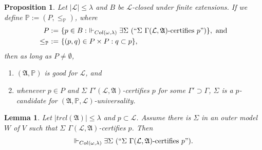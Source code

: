 \documentclass[12pt, twoside]{memoir}
\numberwithin{equation}{section}
\newtheorem{lem}[thm]{Lemma}
\newtheorem{prop}[thm]{Proposition}
\theoremstyle{definition}
\theoremstyle{remark}
\theoremstyle{definition}
\theoremstyle{definition}
\theoremstyle{definition}
\theoremstyle{remark}
\begin{document}
\begin{prop}\label{certgood}
Let $|\mathcal{L}| \leq \lambda$ and $B$ be $\mathcal{L}$-closed under finite extensions. If we define $\mathbb{P} := (P, \leq_{\mathbb{P}})$, where
\begin{align*}
    P := \ & \{p \in B : \ \Vdash_{Col(\omega, \lambda)} \exists \Sigma \ (``\Sigma \ \Gamma(\mathcal{L}, \mathfrak{A}) \text{-certifies } p")\}, \text{ and} \\
    \leq_{\mathbb{P}} \ := \ & \{(p, q) \in P \times P : q \subset p\},
\end{align*}
then as long as $P \neq \emptyset$, 
\begin{enumerate}[label=(\alph*)]
    \item $(\mathfrak{A}, \mathbb{P})$ is good for $\mathcal{L}$, and
    \item whenever $p \in P$ and $\Sigma$ $\Gamma'(\mathcal{L}, \mathfrak{A})$-certifies $p$ for some $\Gamma' \supset \Gamma$, $\Sigma$ is a $p$-candidate for $(\mathfrak{A}, \mathbb{P}, \mathcal{L})$-universality.
\end{enumerate}
\end{prop}

\begin{lem}\label{inout}
Let $|trcl(\mathfrak{A})| \leq \lambda$ and $p \subset \mathcal{L}$. Assume there is $\Sigma$ in an outer model $W$ of $V$ such that $\Sigma$ $\Gamma(\mathcal{L}, \mathfrak{A})$-certifies $p$. Then $$\Vdash_{Col(\omega, \lambda)} \exists \Sigma \ (``\Sigma \ \Gamma(\mathcal{L}, \mathfrak{A}) \text{-certifies } p").$$
\end{lem}
\end{document}

